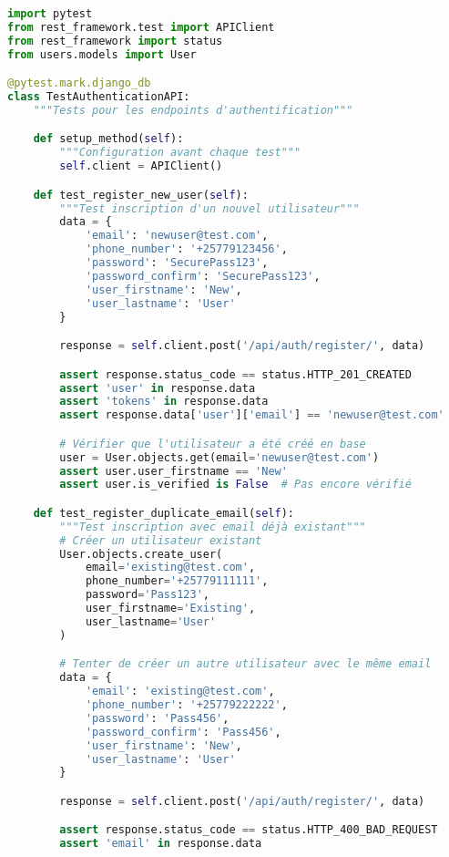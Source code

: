 \begin{lstlisting}[language=Python, caption=users/tests/test\_api.py]
import pytest
from rest_framework.test import APIClient
from rest_framework import status
from users.models import User

@pytest.mark.django_db
class TestAuthenticationAPI:
    """Tests pour les endpoints d'authentification"""

    def setup_method(self):
        """Configuration avant chaque test"""
        self.client = APIClient()

    def test_register_new_user(self):
        """Test inscription d'un nouvel utilisateur"""
        data = {
            'email': 'newuser@test.com',
            'phone_number': '+25779123456',
            'password': 'SecurePass123',
            'password_confirm': 'SecurePass123',
            'user_firstname': 'New',
            'user_lastname': 'User'
        }

        response = self.client.post('/api/auth/register/', data)

        assert response.status_code == status.HTTP_201_CREATED
        assert 'user' in response.data
        assert 'tokens' in response.data
        assert response.data['user']['email'] == 'newuser@test.com'

        # Vérifier que l'utilisateur a été créé en base
        user = User.objects.get(email='newuser@test.com')
        assert user.user_firstname == 'New'
        assert user.is_verified is False  # Pas encore vérifié

    def test_register_duplicate_email(self):
        """Test inscription avec email déjà existant"""
        # Créer un utilisateur existant
        User.objects.create_user(
            email='existing@test.com',
            phone_number='+25779111111',
            password='Pass123',
            user_firstname='Existing',
            user_lastname='User'
        )

        # Tenter de créer un autre utilisateur avec le même email
        data = {
            'email': 'existing@test.com',
            'phone_number': '+25779222222',
            'password': 'Pass456',
            'password_confirm': 'Pass456',
            'user_firstname': 'New',
            'user_lastname': 'User'
        }

        response = self.client.post('/api/auth/register/', data)

        assert response.status_code == status.HTTP_400_BAD_REQUEST
        assert 'email' in response.data


\end{lstlisting}
